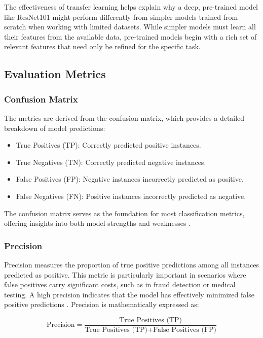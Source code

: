 The effectiveness of transfer learning helps explain why a deep, pre-trained model like ResNet101 might perform differently from simpler models trained from scratch when working with limited datasets. While simpler models must learn all their features from the available data, pre-trained models begin with a rich set of relevant features that need only be refined for the specific task.

\subsection{Evaluation Metrics}

\subsubsection{Confusion Matrix}
The metrics are derived from the confusion matrix, which provides a detailed breakdown of model predictions:
\begin{itemize}
    \item True Positives (TP): Correctly predicted positive instances.
    \item True Negatives (TN): Correctly predicted negative instances.
    \item False Positives (FP): Negative instances incorrectly predicted as positive.
    \item False Negatives (FN): Positive instances incorrectly predicted as negative.
\end{itemize}

The confusion matrix serves as the foundation for most classification metrics, offering insights into both model strengths and weaknesses \cite{article, dalianis2018clinical}.

\subsubsection{Precision}
Precision measures the proportion of true positive predictions among all instances predicted as positive. This metric is particularly important in scenarios where false positives carry significant costs, such as in fraud detection or medical testing. A high precision indicates that the model has effectively minimized false positive predictions \cite{article}. Precision is mathematically expressed as: 

\begin{equation}
    \text{Precision} = \frac{\text{True Positives (TP)}}{\text{True Positives (TP)} + \text{False Positives (FP)}}
\end{equation}

